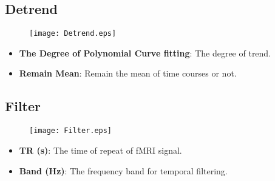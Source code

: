 \documentclass[11pt]{article}
\begin{document}
		\subsection{Detrend}
			\begin{figure}
				\begin{center}
					\texttt{[image: Detrend.eps]}
				\end{center}
			\end{figure}
			\begin{itemize}
				\item \textbf{The Degree of Polynomial Curve fitting}: The degree of trend.
				\item \textbf{Remain Mean}: Remain the mean of time courses or not.
			\end{itemize}
		\subsection{Filter}
			\begin{figure}
				\begin{center}
					\texttt{[image: Filter.eps]}
				\end{center}
			\end{figure}
			\begin{itemize}
				\item \textbf{TR (s)}: The time of repeat of fMRI signal.
				\item \textbf{Band (Hz)}: The frequency band for temporal filtering.
			\end{itemize}
\end{document}
